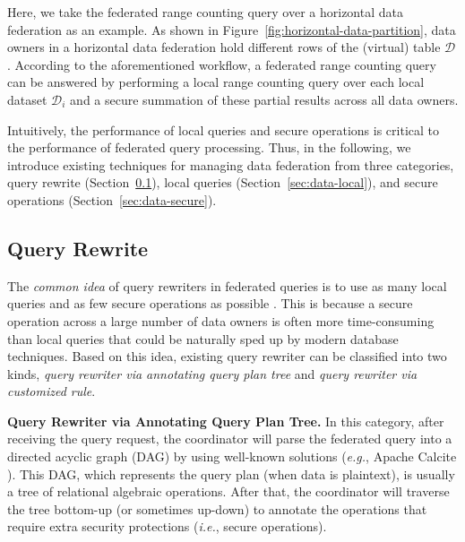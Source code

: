 \documentclass[11pt]{article}
\newcommand{\eg}{\textit{e.g.},\xspace}
\newcommand{\ie}{\textit{i.e.},\xspace}
\newcommand\figref[1]{Figure~\ref{#1}}
\newcommand\secref[1]{Section~\ref{#1}}
\newcommand{\fakeparagraph}[1]{\vspace{1mm}\noindent\textbf{#1.}}
\newcommand{\D}{\mathcal{D}}
\begin{document}
Here, we take the federated range counting query over a horizontal data federation as an example.
As shown in \figref{fig:horizontal-data-partition}, data owners in a horizontal data federation hold different rows of the (virtual) table $\D$.
According to the aforementioned workflow, a federated range counting query can be answered by performing a local range counting query over each local dataset $\D_i$ and a secure summation of these partial results across all data owners.

Intuitively, the performance of local queries and secure operations is critical to the performance of federated query processing.
Thus, in the following, we introduce existing techniques for managing data federation from three categories, query rewrite (\secref{sec:data-rewrite}), local queries (\secref{sec:data-local}), and secure operations (\secref{sec:data-secure}).

\subsection{Query Rewrite}\label{sec:data-rewrite}

The \textit{common idea} of query rewriters in federated queries is to use as many local queries and as few secure operations as possible \cite{ref_tong2022hu}.
This is because a secure operation across a large number of data owners is often more time-consuming than local queries that could be naturally sped up by modern database techniques.
Based on this idea, existing query rewriter can be classified into two kinds, \textit{query rewriter via annotating query plan tree} and \textit{query rewriter via customized rule}.

\fakeparagraph{Query Rewriter via Annotating Query Plan Tree}
In this category, after receiving the query request, the coordinator will parse the federated query into a directed acyclic graph (DAG) by using well-known solutions (\eg Apache Calcite \cite{DBLP:conf/sigmod/BegoliCHML18}).
This DAG, which represents the query plan (when data is plaintext), is usually a tree of relational algebraic operations.
After that, the coordinator will traverse the tree bottom-up (or sometimes up-down) to annotate the operations that require extra security protections (\ie secure operations).
\end{document}
